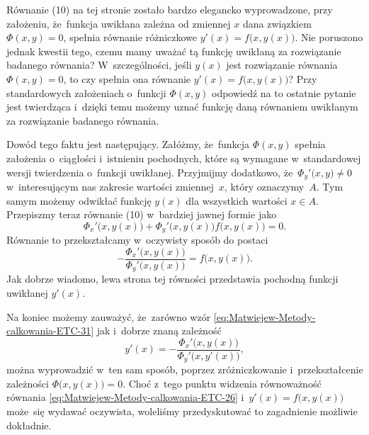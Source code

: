 \documentclass[a4paper,11pt]{article}
\numberwithin{equation}{section}
\begin{document}
\VerSpaceFour





\noindent
{} Równanie (10) na tej stronie zostało bardzo elegancko wyprowadzone,
przy założeniu, że~funkcja uwikłana zależna od zmiennej $x$ dana związkiem
$\Phi( x, y ) = 0$, spełnia równanie różniczkowe
$y'( x ) = f\big( x, y( x ) \big)$. Nie poruszono jednak kwestii tego, czemu
mamy uważać tą funkcję uwikłaną za rozwiązanie badanego równania?
W~szczególności, jeśli $y( x )$ jest rozwiązanie równania $\Phi( x, y ) = 0$,
to czy spełnia ona równanie $y'( x ) = f\big( x, y( x ) \big)$?
Przy standardowych założeniach o~funkcji $\Phi( x, y )$ odpowiedź na to
ostatnie pytanie jest twierdząca i~dzięki temu możemy uznać funkcję daną
równaniem uwikłanym za rozwiązanie badanego równania.

Dowód tego faktu jest następujący. Załóżmy, że~funkcja $\Phi( x, y )$ spełnia
założenia o~ciągłości i~istnieniu pochodnych, które są wymagane
w~standardowej wersji twierdzenia o~funkcji uwikłanej. Przyjmijmy dodatkowo,
że~$\Phi_{ y }'\big( x, y \big) \neq 0$ w~interesującym nas zakresie wartości
zmiennej~$x$, który oznaczymy~$A$. Tym samym możemy odwikłać funkcję
$y( x )$ dla wszystkich wartości $x \in A$. Przepiszmy teraz równanie (10)
w~bardziej jawnej formie jako
\begin{equation}
  \label{eq:Uwagi-do-konkrentych-stron-12}
  \Phi_{ x }'\big( x, y( x ) \big) +
  \Phi_{ y }'\big( x, y( x ) \big) f\big( x, y( x ) \big) = 0.
\end{equation}
Równanie to przekształcamy w~oczywisty sposób do postaci
\begin{equation}
  \label{eq:Uwagi-do-konkrentych-stron-13}
  -\frac{ \Phi_{ x }'\big( x, y( x ) \big) }
  { \Phi_{ y }'\big( x, y( x ) \big) } =
  f\big( x, y( x ) \big).
\end{equation}
Jak dobrze wiadomo, lewa strona tej równości przedstawia pochodną funkcji
uwikłanej $y'( x )$.

Na koniec możemy zauważyć, że~zarówno wzór
\eqref{eq:Matwiejew-Metody-calkowania-ETC-31} jak i~dobrze znaną zależność
\begin{equation}
  \label{eq:Uwagi-do-konkrentych-stron-14}
  y'( x ) =
  -\frac{ \Phi_{ x }'\big( x, y( x ) \big) }{ \Phi_{ y }'\big( x, y'( x ) \big) },
\end{equation}
można wyprowadzić w~ten sam sposób, poprzez zróżniczkowanie
i~przekształcenie zależności $\Phi\big( x, y( x ) \big) = 0$. Choć z~tego
punktu widzenia równoważność równania
\eqref{eq:Matwiejew-Metody-calkowania-ETC-26}
i~$y'( x ) = f\big( x, y( x ) \big)$ może~się wydawać oczywista, woleliśmy
przedyskutować to zagadnienie możliwie dokładnie.
\end{document}
